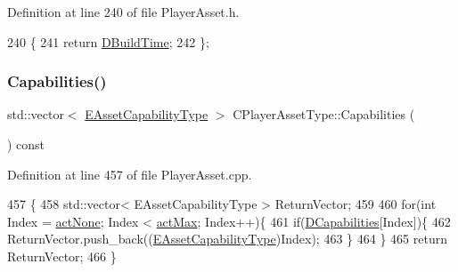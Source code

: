 Definition at line 240 of file Player\+Asset.\+h.


\begin{DoxyCode}
240                              \{
241             \textcolor{keywordflow}{return} \hyperlink{classCPlayerAssetType_aa65de0691276352ebc3c3a9936a74278}{DBuildTime};  
242         \};
\end{DoxyCode}
\hypertarget{classCPlayerAssetType_a361c91efd5482b2c5840e33e7f6a11ad}{}\label{classCPlayerAssetType_a361c91efd5482b2c5840e33e7f6a11ad} 
\subsubsection{\texorpdfstring{Capabilities()}{Capabilities()}}
{\footnotesize\ttfamily std\+::vector$<$ \hyperlink{GameDataTypes_8h_a35b98ce26aca678b03c6f9f76e4778ce}{E\+Asset\+Capability\+Type} $>$ C\+Player\+Asset\+Type\+::\+Capabilities (\begin{DoxyParamCaption}{ }\end{DoxyParamCaption}) const}



Definition at line 457 of file Player\+Asset.\+cpp.


\begin{DoxyCode}
457                                                                       \{
458     std::vector< EAssetCapabilityType > ReturnVector;
459     
460     \textcolor{keywordflow}{for}(\textcolor{keywordtype}{int} Index = \hyperlink{GameDataTypes_8h_a35b98ce26aca678b03c6f9f76e4778ceaa8df154ad276f6f62054e9b5b0696f92}{actNone}; Index < \hyperlink{GameDataTypes_8h_a35b98ce26aca678b03c6f9f76e4778cea77dccd39fc9e5ee854223444006a6f70}{actMax}; Index++)\{
461         \textcolor{keywordflow}{if}(\hyperlink{classCPlayerAssetType_a243f9161c56446b378dc42b51977fc58}{DCapabilities}[Index])\{
462             ReturnVector.push\_back((\hyperlink{GameDataTypes_8h_a35b98ce26aca678b03c6f9f76e4778ce}{EAssetCapabilityType})Index);   
463         \}
464     \}
465     \textcolor{keywordflow}{return} ReturnVector;
466 \}
\end{DoxyCode}
\hypertarget{classCPlayerAssetType_a88770c47bf56913f432c4ec45ea5c2da}{}\label{classCPlayerAssetType_a88770c47bf56913f432c4ec45ea5c2da} 
